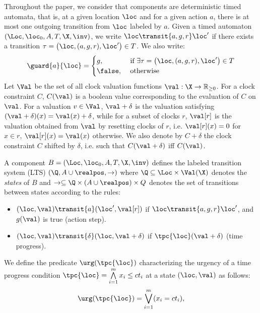 Throughout the paper, we consider that components are deterministic timed automata, that is, 
at a given location $\loc$ and for a given action $a$, there is at most one outgoing transition from $\loc$ labeled by $a$. 
Given a timed automaton $(\Loc, \loc_0, A, T, \X, \inv)$, we write $\loc \transit{a,g,r} \loc'$ 
if there exists a transition $\tau = \big(\loc,(a,g,r),\loc'\big) \in T$. 
We also write: 
\begin{displaymath}
  \guard{a}{\loc}=
  \begin{cases}
    g, &\text{ if } \exists\tau = \big(\loc,(a,g,r),\loc'\big) \in T\\
    \false, &\text{ otherwise }
  \end{cases}
\end{displaymath}
Let $\Val$ be the set of all clock valuation functions
$\val: \X\rightarrow \mathbb{R}_{\ge
  0}$. 
For a clock constraint $C$, $C(\val)$ is a boolean value corresponding to the evaluation of $C$ on
$\val$. For a valuation $v \in \Val$, $\val + \delta$ is the valuation satisfying
$(\val + \delta)(x) = \val(x) + \delta$, while for a subset of clocks $r$, $\val[r]$ 
is the valuation obtained from $\val$ by resetting clocks of $r$, i.e. 
$\val[r](x) = 0$ for $x\in r$, $\val[r](x) = \val(x)$ otherwise.
We also denote by $C+\delta$ the clock constraint $C$ shifted by $\delta$, i.e. such that $C(\val+\delta)$ iff $C(\val)$.
\begin{definition}[Semantics]
  A component $B = (\Loc, \loc_0, A, T, \X, \inv)$ defines the labeled transition system (LTS) 
  $(\Q, A\cup\realpos, \rightarrow)$ where $\Q\subseteq\Loc\times\Val(\X)$ denotes the \emph{states} of $B$ 
  and  $\rightarrow\subseteq\Q\times(A\cup\realpos) \times
  Q$ denotes the set of transitions between states according to the rules:
    \begin{itemize}
    \item $(\loc,\val) \transit{a} (\loc',\val[r])$ if $\loc \transit{a,g,r} \loc'$, and $g(\val)$ is true (action step).
      \item $(\loc,\val) \transit{\delta} (\loc,\val+\delta)$ if $\tpc{\loc}(\val+\delta)$ 
      (time progress).
    \end{itemize}
\end{definition}
We define the predicate $\urg(\tpc{\loc})$ characterizing the urgency of a time progress condition
$\tpc{\loc}=\bigwedge\limits_{i=1}^m x_i\le ct_i$ at a state $(\loc,\val)$ as follows:
\begin{displaymath}
\urg(\tpc{\loc})=\bigvee_{i=1}^m (x_i=ct_i),
\end{displaymath}
